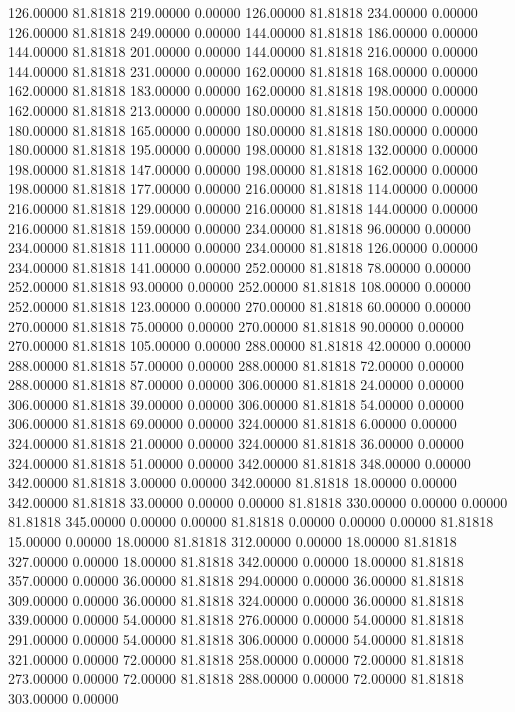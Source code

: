 126.00000 81.81818 219.00000 0.00000
126.00000 81.81818 234.00000 0.00000
126.00000 81.81818 249.00000 0.00000
144.00000 81.81818 186.00000 0.00000
144.00000 81.81818 201.00000 0.00000
144.00000 81.81818 216.00000 0.00000
144.00000 81.81818 231.00000 0.00000
162.00000 81.81818 168.00000 0.00000
162.00000 81.81818 183.00000 0.00000
162.00000 81.81818 198.00000 0.00000
162.00000 81.81818 213.00000 0.00000
180.00000 81.81818 150.00000 0.00000
180.00000 81.81818 165.00000 0.00000
180.00000 81.81818 180.00000 0.00000
180.00000 81.81818 195.00000 0.00000
198.00000 81.81818 132.00000 0.00000
198.00000 81.81818 147.00000 0.00000
198.00000 81.81818 162.00000 0.00000
198.00000 81.81818 177.00000 0.00000
216.00000 81.81818 114.00000 0.00000
216.00000 81.81818 129.00000 0.00000
216.00000 81.81818 144.00000 0.00000
216.00000 81.81818 159.00000 0.00000
234.00000 81.81818 96.00000 0.00000
234.00000 81.81818 111.00000 0.00000
234.00000 81.81818 126.00000 0.00000
234.00000 81.81818 141.00000 0.00000
252.00000 81.81818 78.00000 0.00000
252.00000 81.81818 93.00000 0.00000
252.00000 81.81818 108.00000 0.00000
252.00000 81.81818 123.00000 0.00000
270.00000 81.81818 60.00000 0.00000
270.00000 81.81818 75.00000 0.00000
270.00000 81.81818 90.00000 0.00000
270.00000 81.81818 105.00000 0.00000
288.00000 81.81818 42.00000 0.00000
288.00000 81.81818 57.00000 0.00000
288.00000 81.81818 72.00000 0.00000
288.00000 81.81818 87.00000 0.00000
306.00000 81.81818 24.00000 0.00000
306.00000 81.81818 39.00000 0.00000
306.00000 81.81818 54.00000 0.00000
306.00000 81.81818 69.00000 0.00000
324.00000 81.81818 6.00000 0.00000
324.00000 81.81818 21.00000 0.00000
324.00000 81.81818 36.00000 0.00000
324.00000 81.81818 51.00000 0.00000
342.00000 81.81818 348.00000 0.00000
342.00000 81.81818 3.00000 0.00000
342.00000 81.81818 18.00000 0.00000
342.00000 81.81818 33.00000 0.00000
0.00000 81.81818 330.00000 0.00000
0.00000 81.81818 345.00000 0.00000
0.00000 81.81818 0.00000 0.00000
0.00000 81.81818 15.00000 0.00000
18.00000 81.81818 312.00000 0.00000
18.00000 81.81818 327.00000 0.00000
18.00000 81.81818 342.00000 0.00000
18.00000 81.81818 357.00000 0.00000
36.00000 81.81818 294.00000 0.00000
36.00000 81.81818 309.00000 0.00000
36.00000 81.81818 324.00000 0.00000
36.00000 81.81818 339.00000 0.00000
54.00000 81.81818 276.00000 0.00000
54.00000 81.81818 291.00000 0.00000
54.00000 81.81818 306.00000 0.00000
54.00000 81.81818 321.00000 0.00000
72.00000 81.81818 258.00000 0.00000
72.00000 81.81818 273.00000 0.00000
72.00000 81.81818 288.00000 0.00000
72.00000 81.81818 303.00000 0.00000
